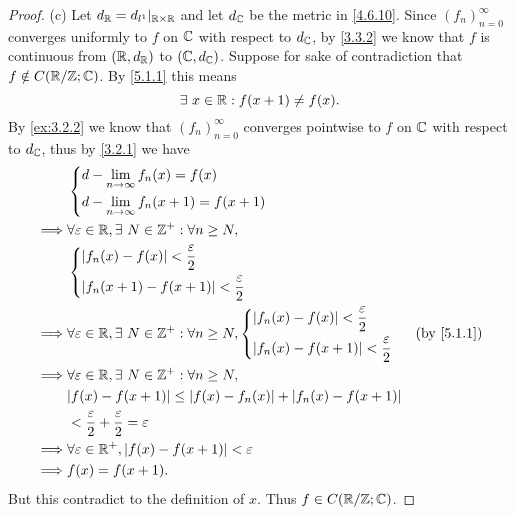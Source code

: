 \begin{proof}{(c)}
  Let \(d_{\mathbb{R}} = d_{l^1}|_{\mathbb{R} \times \mathbb{R}}\) and let \(d_{\mathbb{C}}\) be the metric in \cref{4.6.10}.
  Since \((f_n)_{n = 0}^\infty\) converges uniformly to \(f\) on \(\mathbb{C}\) with respect to \(d_{\mathbb{C}}\), by \cref{3.3.2} we know that \(f\) is continuous from \((\mathbb{R}, d_{\mathbb{R}})\) to \((\mathbb{C}, d_{\mathbb{C}})\).
  Suppose for sake of contradiction that \(f \notin C(\mathbb{R} / \mathbb{Z} ; \mathbb{C})\).
  By \cref{5.1.1} this means
  \[
    \exists\ x \in \mathbb{R} : f(x + 1) \neq f(x).
  \]
  By \cref{ex:3.2.2} we know that \((f_n)_{n = 0}^\infty\) converges pointwise to \(f\) on \(\mathbb{C}\) with respect to \(d_{\mathbb{C}}\), thus by \cref{3.2.1} we have
  \begin{align*}
             & \begin{dcases}
                 d - \lim_{n \to \infty} f_n(x) = f(x) \\
                 d - \lim_{n \to \infty} f_n(x + 1) = f(x + 1)
               \end{dcases}                                                                        \\
    \implies & \forall \varepsilon \in \R, \exists\ N \in \Z^+ : \forall n \geq N,                                                 \\
             & \begin{dcases}
                 \abs{f_n(x) - f(x)} < \dfrac{\varepsilon}{2} \\
                 \abs{f_n(x + 1) - f(x + 1)} < \dfrac{\varepsilon}{2}
               \end{dcases}                                                                 \\
    \implies & \forall \varepsilon \in \R, \exists\ N \in \Z^+ : \forall n \geq N, \begin{dcases}
                                                                                     \abs{f_n(x) - f(x)} < \dfrac{\varepsilon}{2} \\
                                                                                     \abs{f_n(x) - f(x + 1)} < \dfrac{\varepsilon}{2}
                                                                                   \end{dcases} &  & \text{(by \cref{5.1.1})} \\
    \implies & \forall \varepsilon \in \R, \exists\ N \in \Z^+ : \forall n \geq N,                                                 \\
             & \abs{f(x) - f(x + 1)} \leq \abs{f(x) - f_n(x)} + \abs{f_n(x) - f(x + 1)}                                            \\
             & < \dfrac{\varepsilon}{2} + \dfrac{\varepsilon}{2} = \varepsilon                                                     \\
    \implies & \forall \varepsilon \in \R^+, \abs{f(x) - f(x + 1)} < \varepsilon                                                   \\
    \implies & f(x) = f(x + 1).
  \end{align*}
  But this contradict to the definition of \(x\).
  Thus \(f \in C(\mathbb{R} / \mathbb{Z} ; \mathbb{C})\).
\end{proof}

